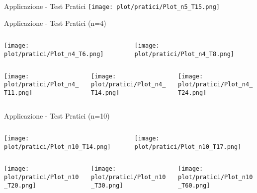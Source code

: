 \documentclass{beamer}
\newcommand{\1}{\mathbbm{1}}
\begin{document}
\begin{frame}{Applicazione - Test Pratici}
\centering\texttt{[image: plot/pratici/Plot\_n5\_T15.png]}
\end{frame}

\begin{frame}{Applicazione - Test Pratici (n=4)}
\begin{columns}
\begin{column}{0.5\linewidth}
\texttt{[image: plot/pratici/Plot\_n4\_T6.png]}
\end{column}
\begin{column}{0.5\linewidth}
\texttt{[image: plot/pratici/Plot\_n4\_T8.png]}
\end{column}
\end{columns}

\begin{columns}
\begin{column}{0.33\linewidth}
\texttt{[image: plot/pratici/Plot\_n4\_T11.png]}
\end{column}
\begin{column}{0.33\linewidth}
\texttt{[image: plot/pratici/Plot\_n4\_T14.png]}
\end{column}
\begin{column}{0.33\linewidth}
\texttt{[image: plot/pratici/Plot\_n4\_T24.png]}
\end{column}
\end{columns}
\end{frame}

\begin{frame}{Applicazione - Test Pratici (n=10)}
\begin{columns}
\begin{column}{0.5\linewidth}
\texttt{[image: plot/pratici/Plot\_n10\_T14.png]}
\end{column}
\begin{column}{0.5\linewidth}
\texttt{[image: plot/pratici/Plot\_n10\_T17.png]}
\end{column}
\end{columns}

\begin{columns}
\begin{column}{0.33\linewidth}
\texttt{[image: plot/pratici/Plot\_n10\_T20.png]}
\end{column}
\begin{column}{0.33\linewidth}
\texttt{[image: plot/pratici/Plot\_n10\_T30.png]}
\end{column}
\begin{column}{0.33\linewidth}
\texttt{[image: plot/pratici/Plot\_n10\_T60.png]}
\end{column}
\end{columns}
\end{frame}
\end{document}
